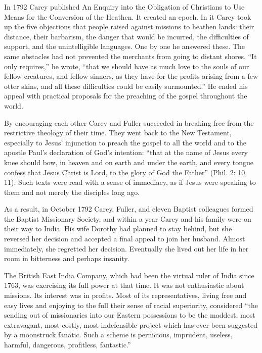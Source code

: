 In 1792 Carey published An Enquiry into the Obligation of Christians to Use Means for the Conversion
of the Heathen. It created an epoch. In it Carey took up the five objections that people raised
against missions to heathen lands: their distance, their barbarism, the danger that would be
incurred, the difficulties of support, and the unintelligible languages. One by one he answered
these. The same obstacles had not prevented the merchants from going to distant shores. “It only
requires,” he wrote, “that we should have as much love to the souls of our fellow-creatures, and
fellow sinners, as they have for the profits arising from a few otter skins, and all these
difficulties could be easily surmounted.” He ended his appeal with practical proposals for the
preaching of the gospel throughout the world.

By encouraging each other Carey and Fuller succeeded in breaking free from the restrictive theology
of their time. They went back to the New Testament, especially to Jesus’ injunction to preach the
gospel to all the world and to the apostle Paul’s declaration of God’s intention: “that at the name
of Jesus every knee should bow, in heaven and on earth and under the earth, and every tongue confess
that Jesus Christ is Lord, to the glory of God the Father” (Phil. 2: 10, 11). Such texts were read
with a sense of immediacy, as if Jesus were speaking to them and not merely the disciples long ago.

As a result, in October 1792 Carey, Fuller, and eleven Baptist colleagues formed the Baptist
Missionary Society, and within a year Carey and his family were on their way to India. His wife
Dorothy had planned to stay behind, but she reversed her decision and accepted a final appeal to
join her husband. Almost immediately, she regretted her decision. Eventually she lived out her life
in her room in bitterness and perhaps insanity.

The British East India Company, which had been the virtual ruler of India since 1763, was exercising
its full power at that time. It was not enthusiastic about missions. Its interest was in profits.
Most of its representatives, living free and easy lives and enjoying to the full their sense of
racial superiority, considered “the sending out of missionaries into our Eastern possessions to be
the maddest, most extravagant, most costly, most indefensible project which has ever been suggested
by a moonstruck fanatic. Such a scheme is pernicious, imprudent, useless, harmful, dangerous,
profitless, fantastic.”

